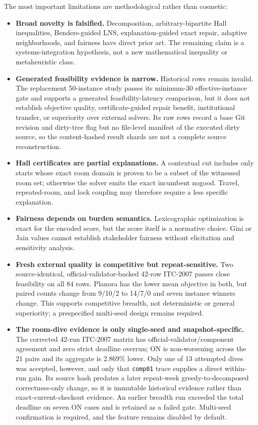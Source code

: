 The most important limitations are methodological rather than cosmetic:
\begin{itemize}[leftmargin=*]
  \item \textbf{Broad novelty is falsified.} Decomposition, arbitrary-bipartite Hall inequalities, Benders-guided LNS, explanation-guided exact repair, adaptive neighborhoods, and fairness have direct prior art. The remaining claim is a systems-integration hypothesis, not a new mathematical inequality or metaheuristic class.
  \item \textbf{Generated feasibility evidence is narrow.} Historical rows remain invalid. The replacement 50-instance study passes its minimum-30 effective-instance gate and supports a generated feasibility-latency comparison, but it does not establish objective quality, certificate-guided repair benefit, institutional transfer, or superiority over external solvers. Its raw rows record a base Git revision and dirty-tree flag but no file-level manifest of the executed dirty source, so the content-hashed result shards are not a complete source reconstruction.
  \item \textbf{Hall certificates are partial explanations.} A contextual cut includes only starts whose exact room domain is proven to be a subset of the witnessed room set; otherwise the solver emits the exact incumbent nogood. Travel, repeated-room, and lock coupling may therefore require a less specific explanation.
  \item \textbf{Fairness depends on burden semantics.} Lexicographic optimization is exact for the encoded score, but the score itself is a normative choice. Gini or Jain values cannot establish stakeholder fairness without elicitation and sensitivity analysis.
  \item \textbf{Fresh external quality is competitive but repeat-sensitive.} Two source-identical, official-validator-backed 42-row ITC-2007 passes close feasibility on all 84 rows. Planora has the lower mean objective in both, but paired counts change from 9/10/2 to 14/7/0 and seven instance winners change. This supports competitive breadth, not deterministic or general superiority; a prespecified multi-seed design remains required.
  \item \textbf{The room-dive evidence is only single-seed and snapshot-specific.} The corrected 42-run ITC-2007 matrix has official-validator/component agreement and zero strict deadline overrun; ON is non-worsening across the 21 pairs and its aggregate is 2.869\% lower. Only one of 13 attempted dives was accepted, however, and only that \texttt{comp01} trace supplies a direct within-run gain. Its source hash predates a later repeat-week greedy-to-decomposed correctness-only change, so it is immutable historical evidence rather than exact-current-checkout evidence. An earlier breadth run exceeded the total deadline on seven ON cases and is retained as a failed gate. Multi-seed confirmation is required, and the feature remains disabled by default.

\end{itemize}
